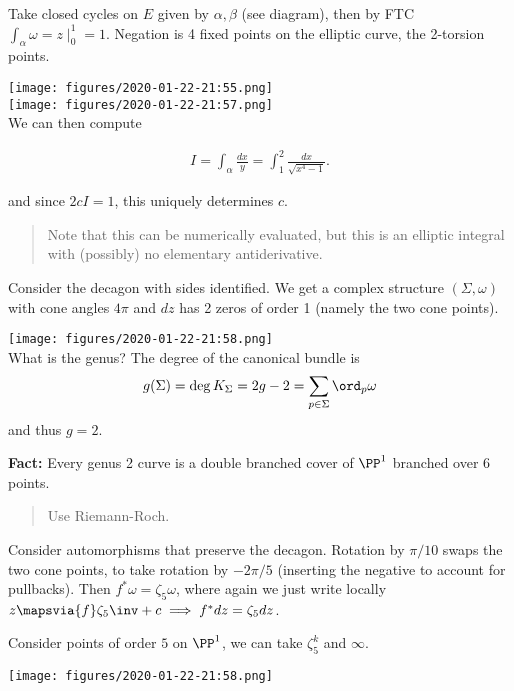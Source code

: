 Take closed cycles on \(E\) given by \(\alpha, \beta\) (see diagram),
then by FTC \(\int_\alpha \omega = z \mid_0^1 = 1\). Negation is 4 fixed
points on the elliptic curve, the 2-torsion points.

\texttt{[image: figures/2020-01-22-21:55.png]}\\

\texttt{[image: figures/2020-01-22-21:57.png]}\\

We can then compute

\begin{align*}
I = \int_\alpha  \frac{dx}{y} = \int_1^2 \frac{dx}{\sqrt{x^4 - 1}} 
.\end{align*}

and since \(2c I = 1\), this uniquely determines \(c\).

\begin{quote}
Note that this can be numerically evaluated, but this is an elliptic
integral with (possibly) no elementary antiderivative.
\end{quote}

Consider the decagon with sides identified. We get a complex structure
\((\Sigma, \omega)\) with cone angles \(4\pi\) and \(dz\) has 2 zeros of
order 1 (namely the two cone points).

\texttt{[image: figures/2020-01-22-21:58.png]}\\

What is the genus? The degree of the canonical bundle is
\begin{align*}
g(\Sigma) = \deg K_\Sigma = 2g - 2 = \sum_{p\in \Sigma}\ord_p \omega
\end{align*} and thus \(g = 2\).

\textbf{Fact:} Every genus 2 curve is a double branched cover of
\(\PP^1\) branched over 6 points.

\begin{quote}
Use Riemann-Roch.
\end{quote}

Consider automorphisms that preserve the decagon. Rotation by \(\pi/10\)
swaps the two cone points, to take rotation by \(-2\pi/5\) (inserting
the negative to account for pullbacks). Then
\(f^* \omega = \zeta_5 \omega\), where again we just write locally
\(z \mapsvia{f} \zeta_5\inv + c \implies f^* dz = \zeta_5 dz\).

Consider points of order \(5\) on \(\PP^1\), we can take \(\zeta_5^k\)
and \(\infty\).

\texttt{[image: figures/2020-01-22-21:58.png]}\\

